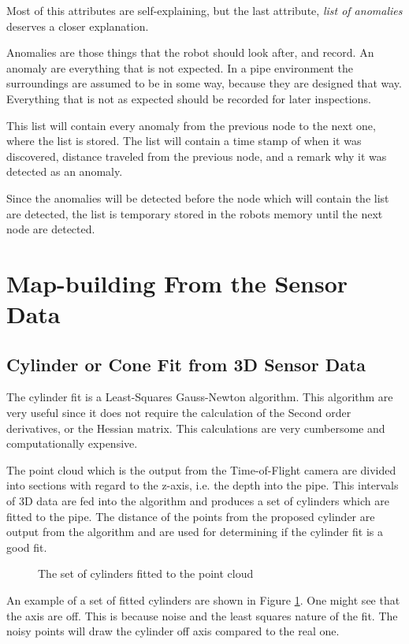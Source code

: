 Most of this attributes are self-explaining, but the last attribute, \emph{list of
anomalies} deserves a closer explanation. 

Anomalies are those things that the robot should look after, and record. An anomaly are
everything that is not expected. In a pipe environment the surroundings are assumed to be
in some way, because they are designed that way. Everything that is not as expected should
be recorded for later inspections. 

This list will contain every anomaly from the previous node to the next one, where the
list is stored. The list will contain a time stamp of when it was discovered, distance
traveled from the previous node, and a remark why it was detected as an anomaly. 

Since the anomalies will be detected before the node which will contain the list are
detected, the list is temporary stored in the robots memory until the next node are
detected. 


\section{Map-building From the Sensor Data}


\subsection{Cylinder or Cone Fit from 3D Sensor Data}
The cylinder fit is a Least-Squares Gauss-Newton algorithm. This algorithm are very
useful since it does not require the calculation of the Second order derivatives, or the
Hessian matrix. This calculations are very cumbersome and computationally expensive. 

The point cloud which is the output from the Time-of-Flight camera are divided into
sections with regard to the z-axis, i.e. the depth into the pipe. This intervals of 3D
data are fed into the algorithm and produces a set of cylinders which are fitted to the
pipe. The distance of the points from the proposed cylinder are output from the algorithm
and are used for determining if the cylinder fit is a good fit. 

\begin{figure}[htbp]
    \centering
    \caption{The set of cylinders fitted to the point cloud}
    \label{chap5:fig-cylinderfit}
\end{figure}
An example of a set of fitted cylinders are shown in Figure \ref{chap5:fig-cylinderfit}.
One might see that the axis are off. This is because noise and the least squares nature of
the fit. The noisy points will draw the cylinder off axis compared to the real one. 


